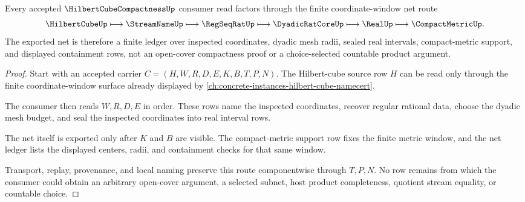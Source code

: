\begin{theorem}
\label{thm:hilbert-cube-compactness-finite-coordinate-net}
Every accepted $\HilbertCubeCompactnessUp$ consumer read factors through the finite coordinate-window net route
$$
\HilbertCubeUp \longmapsto \StreamNameUp \longmapsto \RegSeqRatUp \longmapsto \DyadicRatCoreUp \longmapsto \RealUp \longmapsto \CompactMetricUp .
$$
The exported net is therefore a finite ledger over inspected coordinates, dyadic mesh radii, sealed real intervals, compact-metric support, and displayed containment rows, not an open-cover compactness proof or a choice-selected countable product argument.
\end{theorem}
\begin{proof}
Start with an accepted carrier $C=(H,W,R,D,E,K,B,T,P,N)$. The Hilbert-cube source row $H$ can be read only through the finite coordinate-window surface already displayed by \autoref{ch:concrete-instances-hilbert-cube-namecert}.

The consumer then reads $W,R,D,E$ in order. These rows name the inspected coordinates, recover regular rational data, choose the dyadic mesh budget, and seal the inspected coordinates into real interval rows.

The net itself is exported only after $K$ and $B$ are visible. The compact-metric support row fixes the finite metric window, and the net ledger lists the displayed centers, radii, and containment checks for that same window.

Transport, replay, provenance, and local naming preserve this route componentwise through $T,P,N$. No row remains from which the consumer could obtain an arbitrary open-cover argument, a selected subnet, host product completeness, quotient stream equality, or countable choice.
\end{proof}

